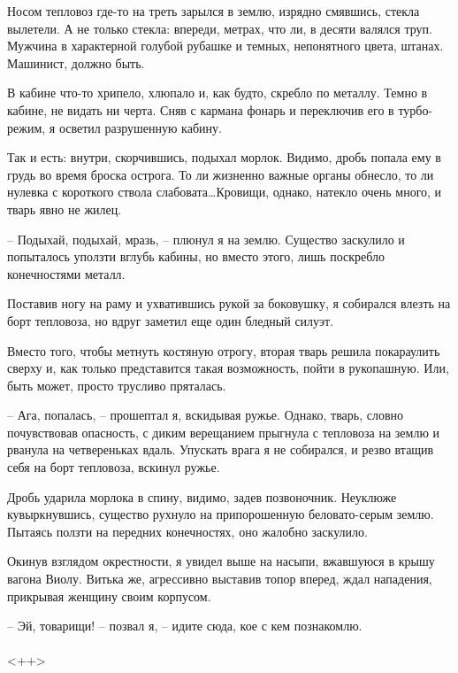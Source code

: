 \documentclass[a4paper]{book}
\begin{document}
Носом тепловоз где-то на треть зарылся в землю, изрядно смявшись, стекла вылетели. А не только стекла: впереди, метрах, что ли, в десяти валялся труп. Мужчина в характерной голубой рубашке и темных, непонятного цвета, штанах. Машинист, должно быть. 

В кабине что-то хрипело, хлюпало и, как будто, скребло по металлу. Темно в кабине, не видать ни черта. Сняв с кармана фонарь и переключив его в турбо-режим, я осветил разрушенную кабину. 

Так и есть: внутри, скорчившись, подыхал морлок. Видимо, дробь попала ему в грудь во время броска острога. То ли жизненно важные органы обнесло, то ли нулевка с короткого ствола слабовата\ldots Кровищи, однако, натекло очень много, и тварь явно не жилец.

-- Подыхай, подыхай, мразь, -- плюнул я на землю. Существо заскулило и попыталось уползти вглубь кабины, но вместо этого, лишь поскребло конечностями металл. 

Поставив ногу на раму и ухватившись рукой за боковушку, я собирался влезть на борт тепловоза, но вдруг заметил еще один бледный силуэт. 

Вместо того, чтобы метнуть костяную отрогу, вторая тварь решила покараулить сверху и, как только представится такая возможность, пойти в рукопашную. Или, быть может, просто трусливо пряталась.  

-- Ага, попалась, -- прошептал я, вскидывая ружье. Однако, тварь, словно почувствовав опасность, с диким верещанием прыгнула с тепловоза на землю и рванула на четвереньках вдаль. Упускать врага я не собирался, и резво втащив себя на борт тепловоза, вскинул ружье. 

Дробь ударила морлока в спину, видимо, задев позвоночник. Неуклюже кувыркнувшись, существо рухнуло на припорошенную беловато-серым землю. Пытаясь ползти на передних конечностях, оно жалобно заскулило. 

Окинув взглядом окрестности, я увидел выше на насыпи, вжавшуюся в крышу вагона Виолу. Витька же, агрессивно выставив топор вперед, ждал нападения, прикрывая женщину своим корпусом. 

-- Эй, товарищи! -- позвал я, -- идите сюда, кое с кем познакомлю. 



\paragraph{}<++>
\end{document}

